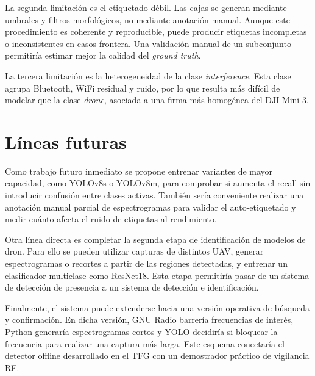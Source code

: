 La segunda limitación es el etiquetado débil. Las cajas se generan mediante umbrales y filtros morfológicos, no mediante anotación manual. Aunque este procedimiento es coherente y reproducible, puede producir etiquetas incompletas o inconsistentes en casos frontera. Una validación manual de un subconjunto permitiría estimar mejor la calidad del \emph{ground truth}.

La tercera limitación es la heterogeneidad de la clase \emph{interference}. Esta clase agrupa Bluetooth, WiFi residual y ruido, por lo que resulta más difícil de modelar que la clase \emph{drone}, asociada a una firma más homogénea del DJI Mini 3.

\section{Líneas futuras}
\label{sec:lineas_futuras}

Como trabajo futuro inmediato se propone entrenar variantes de mayor capacidad, como YOLOv8s o YOLOv8m, para comprobar si aumenta el recall sin introducir confusión entre clases activas. También sería conveniente realizar una anotación manual parcial de espectrogramas para validar el auto-etiquetado y medir cuánto afecta el ruido de etiquetas al rendimiento.

Otra línea directa es completar la segunda etapa de identificación de modelos de dron. Para ello se pueden utilizar capturas de distintos UAV, generar espectrogramas o recortes a partir de las regiones detectadas, y entrenar un clasificador multiclase como ResNet18. Esta etapa permitiría pasar de un sistema de detección de presencia a un sistema de detección e identificación.

Finalmente, el sistema puede extenderse hacia una versión operativa de búsqueda y confirmación. En dicha versión, GNU Radio barrería frecuencias de interés, Python generaría espectrogramas cortos y YOLO decidiría si bloquear la frecuencia para realizar una captura más larga. Este esquema conectaría el detector offline desarrollado en el TFG con un demostrador práctico de vigilancia RF.
